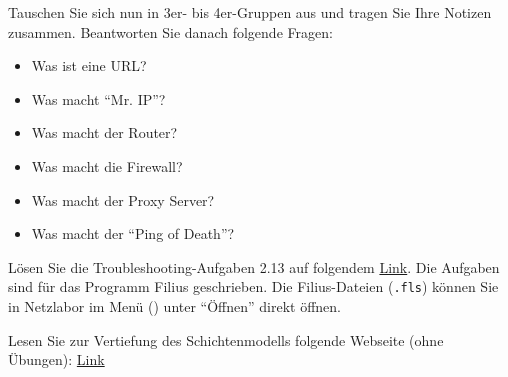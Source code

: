 \begin{myexercise}
	Tauschen Sie sich nun in 3er- bis 4er-Gruppen aus und tragen Sie Ihre Notizen zusammen. Beantworten Sie danach folgende Fragen:
	\begin{itemize}
		\item Was ist eine \gls{URL}?
		\item Was macht \enquote{Mr. IP}?
		\item Was macht der Router?
		\item Was macht die Firewall?
		\item Was macht der Proxy Server?
		\item Was macht der \enquote{Ping of Death}? \faSkull
	\end{itemize}
\end{myexercise}



\begin{mychallenge}
	Lösen Sie die Troubleshooting-Aufgaben 2.13 auf folgendem \href{https://informatik.mygymer.ch/base/?book=network}{Link}. Die Aufgaben sind für das Programm Filius geschrieben. Die Filius-Dateien (\texttt{.fls}) können Sie in Netzlabor im Menü (\faBars) unter \enquote{Öffnen} direkt öffnen.
\end{mychallenge}

\begin{mychallenge}
	Lesen Sie zur Vertiefung des Schichtenmodells folgende Webseite (ohne Übungen): \href{https://oinf.ch/kurs/vernetzung-und-systeme/kommunikation-in-netzwerken/}{Link}
\end{mychallenge}
